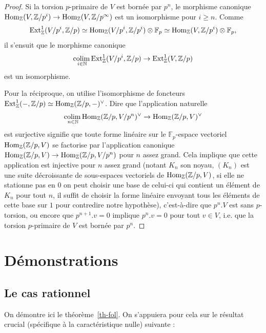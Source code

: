 \documentclass[a4paper,10pt]{article}
\newcommand{\col}{{\rm colim}\,}
\theoremstyle{definition}
\theoremstyle{remark}
\begin{document}
\begin{proof}
 Si la torsion $p$-primaire de $V$ est bornée par $p^n$, le morphisme canonique ${\rm Hom}_\mathbb{Z}(V,\mathbb{Z}/p^i)\to {\rm Hom}_\mathbb{Z}(V,\mathbb{Z}/p^\infty)$ est un isomorphisme pour $i\geq n$. Comme
$${\rm Ext}^1_\mathbb{Z}(V/p^i,\mathbb{Z}/p)\simeq{\rm Hom}_\mathbb{Z}(V/p^i,\mathbb{Z}/p^i)\otimes\mathbb{F}_p\simeq{\rm Hom}_\mathbb{Z}(V,\mathbb{Z}/p^i)\otimes\mathbb{F}_p,$$
il s'ensuit que le morphisme canonique
$$\underset{i\in\mathbb{N}}{\col} {\rm Ext}^1_\mathbb{Z}(V/p^i,\mathbb{Z}/p)\to {\rm Ext}^1_\mathbb{Z}(V,\mathbb{Z}/p)$$
est un isomorphisme.

Pour la réciproque, on utilise l'isomorphisme de foncteurs ${\rm Ext}^1_\mathbb{Z}(-,\mathbb{Z}/p)\simeq {\rm Hom}_\mathbb{Z}(\mathbb{Z}/p,-)^\vee$. Dire que l'application naturelle
$$\underset{n\in\mathbb{N}}{\col}{\rm Hom}_\mathbb{Z}(\mathbb{Z}/p,V/p^n)^\vee\to{\rm Hom}_\mathbb{Z}(\mathbb{Z}/p,V)^\vee$$
est surjective signifie que toute forme linéaire sur le $\mathbb{F}_p$-espace vectoriel ${\rm Hom}_\mathbb{Z}(\mathbb{Z}/p,V)$ se factorise par l'application canonique ${\rm Hom}_\mathbb{Z}(\mathbb{Z}/p,V)\to{\rm Hom}_\mathbb{Z}(\mathbb{Z}/p,V/p^n)$ pour $n$ assez grand. Cela implique que cette application est injective pour $n$ assez grand (notant $K_n$ son noyau, $(K_n)$ est une suite décroissante de sous-espaces vectoriels de ${\rm Hom}_\mathbb{Z}(\mathbb{Z}/p,V)$, si elle ne stationne pas en $0$ on peut choisir une base de celui-ci qui contient un élément de $K_n$ pour tout $n$, il suffit de choisir la forme linéaire envoyant tous les éléments de cette base sur $1$ pour contredire notre hypothèse), c'est-à-dire que $p^n.V$ est sans $p$-torsion, ou encore que $p^{n+1}.v=0$ implique $p^n.v=0$ pour tout $v\in V$, i.e. que la torsion $p$-primaire de $V$ est bornée par $p^n$. 
\end{proof}


\section{Démonstrations}\label{sd}

\subsection{Le cas rationnel}

On démontre ici le théorème~\ref{th-fol}. On s'appuiera pour cela sur le résultat crucial (spécifique à la caractéristique nulle) suivante :
\end{document}

